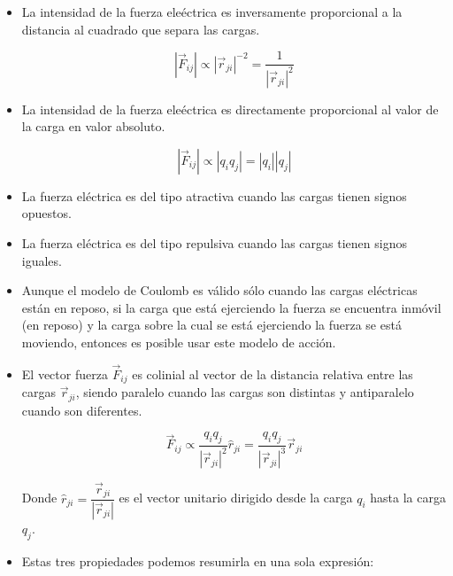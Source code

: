 \documentclass[a4paper,10pt]{article}
\begin{document}
\begin{itemize}
\item La intensidad de la fuerza ele\'ectrica es inversamente proporcional a la distancia al
cuadrado que separa las cargas.

\begin{equation*}
    \boxed{\left\lvert\vec{F}_{ij}\right\lvert\varpropto
    \left\lvert\vec{r}_{ji}\right\lvert^{-2}=
    \frac{1}{\left\lvert\vec{r}_{ji}\right\lvert^2}}
\end{equation*}

\item La intensidad de la fuerza ele\'ectrica es directamente proporcional al valor de la
carga en valor absoluto.

\begin{equation*}
    \boxed{\left\lvert\vec{F}_{ij}\right\lvert\varpropto
    \left\lvert q_{i}q_{j}\right\lvert=\left\lvert q_{i}\right\lvert
    \left\lvert q_{j}\right\lvert}
\end{equation*}

\item La fuerza el\'ectrica es del tipo atractiva cuando las cargas tienen signos opuestos.

\item La fuerza el\'ectrica es del tipo repulsiva cuando las cargas tienen signos iguales.

\item Aunque el modelo de Coulomb es v\'alido s\'olo cuando las cargas el\'ectricas est\'an
en reposo, si la carga que est\'a ejerciendo la fuerza se encuentra inm\'ovil (en reposo)
y la carga sobre la cual se est\'a ejerciendo la fuerza se est\'a moviendo, entonces 
es posible usar este modelo de acci\'on.

\item El vector fuerza $\vec{F}_{ij}$ es colinial al vector de la distancia relativa entre
las cargas $\vec{r}_{ji}$, siendo paralelo cuando las cargas son distintas y antiparalelo
cuando son diferentes.

\begin{equation*}
    \boxed{\vec{F}_{ij}\varpropto
    \frac{q_{i}q_{j}}{\left\lvert\vec{r}_{ji}\right\lvert^2}\hat{r}_{ji}=
    \frac{q_{i}q_{j}}{\left\lvert\vec{r}_{ji}\right\lvert^3}\vec{r}_{ji}}
\end{equation*}

Donde $\hat{r}_{ji}=\dfrac{\vec{r}_{ji}}{\left\lvert\vec{r}_{ji}\right\lvert}$ es el vector
unitario dirigido desde la carga $q_i$ hasta la carga $q_j$.

\item Estas tres propiedades podemos resumirla en una sola expresi\'on:


\end{itemize}
\end{document}

